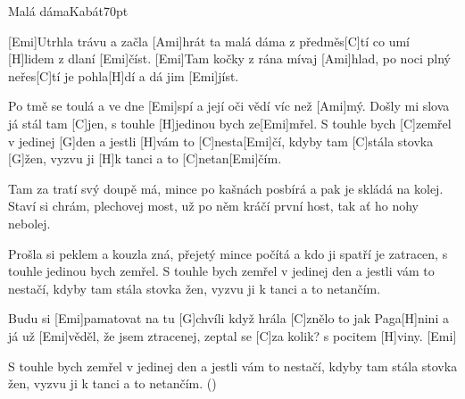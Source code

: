 \begin{song}{Malá dáma}{Kabát}{70pt}

%
[Emi]{}Utrhla trávu a začla [Ami]hrát ta malá dáma z předměs[C]tí
co umí [H]lidem z dlaní [Emi]{číst}.
[Emi]{}Tam kočky z rána mívaj [Ami]hlad, po noci plný neřes[C]tí
je pohla[H]dí a dá jim [Emi]jíst.

\chorus%
[Ami]Po tmě se toulá a ve dne [Emi]spí a její oči vědí víc než [Ami]mý.
Došly mi slova já stál tam [C]jen, s touhle [H]jedinou bych ze[Emi]mřel.
S touhle bych [C]zemřel v jedinej [G]den a jestli [H]vám to [C]nesta[Emi]{čí},
kdyby tam [C]stála stovka [G]{ž}en, vyzvu ji [H]k tanci a to [C]netan[Emi]{čím}.

%
Tam za tratí svý doupě má, mince po kašnách posbírá 
a pak je skládá na kolej.
Staví si chrám, plechovej most, už po něm kráčí první host,
tak ať ho nohy nebolej.

\chorus%
Prošla si peklem a kouzla zná, přejetý mince počítá 
a kdo ji spatří je zatracen, s touhle jedinou bych zemřel.
S touhle bych zemřel v jedinej den a jestli vám to nestačí,
kdyby tam stála stovka žen, vyzvu ji k tanci a to netančím.

\verse{*}%
Budu si [Emi]pamatovat na tu [G]chvíli když hrála [C]znělo to jak Paga[H]nini
a já už [Emi]věděl, že jsem ztracenej, zeptal se [C]za kolik? s pocitem [H]viny.
[Emi]{}

\chorus%
S touhle bych zemřel v jedinej den a jestli vám to nestačí,
kdyby tam stála stovka žen, vyzvu ji k tanci a to netančím.
()
\end{song}
